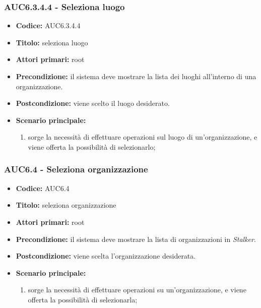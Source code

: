 \documentclass[casi-duso]{subfiles}
\begin{document}
\subsubsection{AUC6.3.4.4 - Seleziona luogo}%
\label{subsub:AUC6.3.4.4}
\begin{itemize}
  \item \textbf{Codice:} AUC6.3.4.4
  \item \textbf{Titolo:} seleziona luogo
  \item \textbf{Attori primari:} root
  \item \textbf{Precondizione:} il sistema deve mostrare la lista dei luoghi all'interno di una organizzazione.
  \item \textbf{Postcondizione:} viene scelto il luogo desiderato.
  \item \textbf{Scenario principale:}
  \begin{enumerate}
    \item sorge la necessità di effettuare operazioni sul luogo di un'organizzazione, e viene offerta la possibilità di selezionarlo;
  \end{enumerate}
\end{itemize}

\subsubsection{AUC6.4 - Seleziona organizzazione}%
\label{subsub:AUC6.4}
\begin{itemize}
  \item \textbf{Codice:} AUC6.4
  \item \textbf{Titolo:} seleziona organizzazione
  \item \textbf{Attori primari:} root
  \item \textbf{Precondizione:} il sistema deve mostrare la lista di organizzazioni in \emph{Stalker}.
  \item \textbf{Postcondizione:} viene scelta l'organizzazione desiderata.
  \item \textbf{Scenario principale:}
  \begin{enumerate}
    \item sorge la necessità di effettuare operazioni su un'organizzazione, e viene offerta la possibilità di selezionarla;
  \end{enumerate}
\end{itemize}
\end{document}
